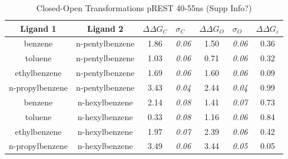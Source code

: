 \documentclass[T4paper.tex]{subfiles}
\begin{document}
\begin{table}[!htb]
\centering
\caption{Closed-Open Transformations pREST 40-55ns (Supp Info?)}
\label{tbl:C-O_pREST-40-55ns}
\begin{tabular}{|c|c|c|l|c|l|c|}
\hline
\textbf{Ligand 1}       & \textbf{Ligand 2}    & {\color[HTML]{800080} \boldmath$\Delta\Delta G_{C}$} & {\color[HTML]{800080} \boldmath$\sigma_{C}$} & {\color[HTML]{008000} \boldmath$\Delta\Delta G_{O}$} & {\color[HTML]{008000} \boldmath$\sigma_{O}$} & \boldmath$\Delta\Delta G_{\varepsilon}$ \\ \hline
\cellcolor[HTML]{800080}benzene         & \cellcolor[HTML]{008000}n-pentylbenzene & 1.86                                   & \textit{0.06}                       & 1.50                                & \textit{0.06}                       & \cellcolor[HTML]{9AFF99}0.36 \\ \hline
\cellcolor[HTML]{800080}toluene         & \cellcolor[HTML]{008000}n-pentylbenzene & 1.03                                   & \textit{0.06}                       & 0.71                                 & \textit{0.06}                       & \cellcolor[HTML]{9AFF99}0.32 \\ \hline
\cellcolor[HTML]{800080}ethylbenzene    & \cellcolor[HTML]{008000}n-pentylbenzene & 1.69                                   & \textit{0.06}                       & 1.60                                 & \textit{0.06}                       & \cellcolor[HTML]{9AFF99}0.09 \\ \hline
\cellcolor[HTML]{800080}n-propylbenzene & \cellcolor[HTML]{008000}n-pentylbenzene & 3.43                                   & \textit{0.04}                       & 2.44                                & \textit{0.04}                       & \cellcolor[HTML]{9AFF99}0.99 \\ \hline
\cellcolor[HTML]{800080}benzene         & \cellcolor[HTML]{008000}n-hexylbenzene  & 2.14                                   & \textit{0.08}                       & 1.41                                & \textit{0.07}                       & \cellcolor[HTML]{9AFF99}0.73 \\ \hline
\cellcolor[HTML]{800080}toluene         & \cellcolor[HTML]{008000}n-hexylbenzene  & 0.33                                   & \textit{0.08}                       & 1.16                                & \textit{0.06}                       & \cellcolor[HTML]{9AFF99}0.84 \\ \hline
\cellcolor[HTML]{800080}ethylbenzene    & \cellcolor[HTML]{008000}n-hexylbenzene  & 1.97                                   & \textit{0.07}                       & 2.39                                & \textit{0.06}                       & \cellcolor[HTML]{9AFF99}0.42 \\ \hline
\cellcolor[HTML]{800080}n-propylbenzene & \cellcolor[HTML]{008000}n-hexylbenzene  & 3.49                                   & \textit{0.06}                       & 3.44                                 & \textit{0.05}                       & \cellcolor[HTML]{9AFF99}0.05 \\ \hline
\end{tabular}


\end{table}
\end{document}
